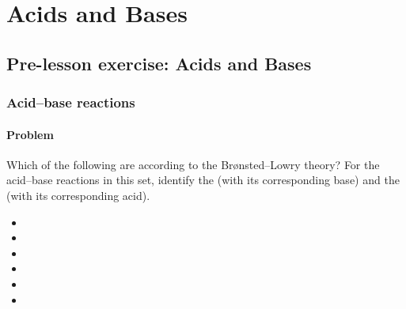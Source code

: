 \chapter{Acids and Bases}
\section{Pre-lesson exercise: Acids and Bases}
\subsection{Acid--base reactions}
\subsubsection{Problem}
Which of the following are 
according to the Brønsted--Lowry theory? For the acid--base
reactions in this set, identify the 
(with its corresponding base)
and the  (with its corresponding acid).

\begin{itemize}
	\item {}
	\item {}
	\item {}
	\item {}
	\item {}
	\item {}
\end{itemize}


